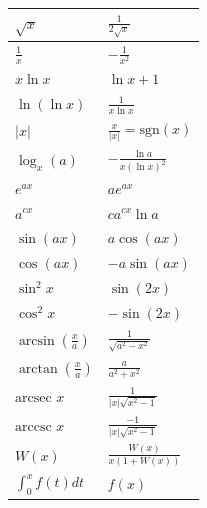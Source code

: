 \begin{center}
\begin{tabularx}{\columnwidth}{|>{\hsize=0.8\hsize\raggedright\arraybackslash}X|>{\hsize=1.2\hsize\raggedright\arraybackslash}X|}
$\sqrt{x}$ & $\frac{1}{2\sqrt{x}}$ \\ \hline
$\frac{1}{x}$ & $-\frac{1}{x^2}$ \\ \hline
$x \ln x$ & $\ln x + 1$ \\ \hline
$\ln(\ln x)$ & $\frac{1}{x \ln x}$ \\ \hline
$|x|$ & $\frac{x}{|x|} = \text{sgn}(x)$ \\ \hline
$\log_x(a)$ & $-\frac{\ln a}{x (\ln x)^2}$ \\ \hline
$e^{ax}$ & $a e^{ax}$ \\ \hline
$a^{cx}$ & $c a^{cx} \ln a$ \\ \hline
$\sin(ax)$ & $a \cos(ax)$ \\ \hline
$\cos(ax)$ & $-a \sin(ax)$ \\ \hline
$\sin^2 x$ & $\sin(2x)$ \\ \hline
$\cos^2 x$ & $-\sin(2x)$ \\ \hline
$\arcsin(\frac{x}{a})$ & $\frac{1}{\sqrt{a^2-x^2}}$ \\ \hline
$\arctan(\frac{x}{a})$ & $\frac{a}{a^2+x^2}$ \\ \hline
$\text{arcsec } x$ & $\frac{1}{|x|\sqrt{x^2-1}}$ \\ \hline
$\text{arccsc } x$ & $\frac{-1}{|x|\sqrt{x^2-1}}$ \\ \hline
$W(x)$ & $\frac{W(x)}{x(1+W(x))}$ \\ \hline
$\int_0^x f(t) dt$ & $f(x)$ \\ \hline
\end{tabularx}
\end{center}

